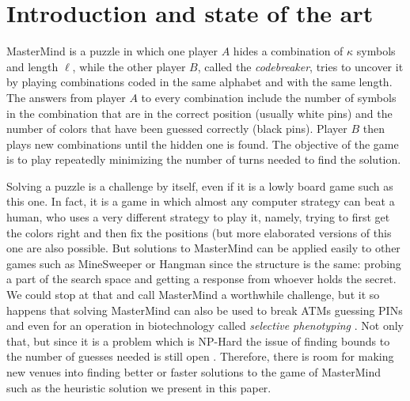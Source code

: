 \documentclass[conference]{IEEEtran}
\begin{document}
\IEEEpeerreviewmaketitle

\section{Introduction and state of the art}

MasterMind \cite{Knuth,Montgomery} 
is a puzzle in which one player $A$ hides a combination of
$\kappa$ symbols and length $\ell$, while the other player $B$, called
the {\em codebreaker}, tries to
uncover it by playing combinations coded in the same alphabet and with the same
length. The answers from player $A$ to every combination include the number of
symbols in the combination that are in the correct position (usually
white pins) and the number of colors that have been guessed correctly
(black pins).  
Player $B$ then plays new combinations until the hidden one is
found. The objective of the game is to play repeatedly minimizing the
number of turns needed to find the solution.  

Solving a puzzle is a challenge by itself, even if it is a lowly board
game such as this one. In fact, it is a game in which almost any
computer strategy can beat a human, who uses a very different
strategy \cite{laughlin1982selection,hubalovsky2012modeling} to play
it, namely, trying to first get the colors right and then fix the
positions (but more elaborated versions of this one are also
possible. 
But solutions to MasterMind can be applied easily to other games such as MineSweeper \cite{legendre2012minesweeper} or Hangman since the structure is the
same: probing a part of the search space and getting a response from
whoever holds the secret. We could stop at that and call MasterMind a
worthwhile challenge, 
but it so happens that solving MasterMind can also be used to break ATMs guessing PINs \cite{focardi2011guessing} and even for an operation in biotechnology called {\em selective phenotyping} \cite{gagneur2011selective}. Not only that, but since it is a problem which is NP-Hard
\cite{DBLP:journals/corr/abs-1111-6922} the issue of finding bounds to
the number of guesses needed is still open
\cite{doerr2012playing}. Therefore, there is room for making new
venues into finding better or faster solutions to the game of
MasterMind such as the heuristic solution we present in this paper. 
\end{document}
